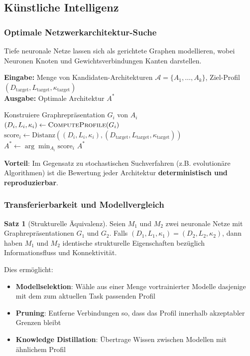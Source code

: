 ﻿\documentclass[a4paper,12pt]{article}
\theoremstyle{definition}
\newtheorem{satz}{Satz}
\begin{document}
	\subsection{Künstliche Intelligenz}

	\subsubsection{Optimale Netzwerkarchitektur-Suche}

	Tiefe neuronale Netze lassen sich als gerichtete Graphen modellieren, wobei Neuronen Knoten und Gewichtsverbindungen Kanten darstellen.
	
	\begin{algorithm}[H]
		\caption{Profilbasierte Neural Architecture Search}
		\label{alg:nas}
		\textbf{Eingabe:} Menge von Kandidaten-Architekturen $\mathcal{A} = \{A_1, \ldots, A_k\}$, Ziel-Profil $(D_{\text{target}}, L_{\text{target}}, \kappa_{\text{target}})$ \\
		\textbf{Ausgabe:} Optimale Architektur $A^*$
		\begin{algorithmic}[1]
			\State Konstruiere Graphrepräsentation $G_i$ von $A_i$
			\State $(D_i, L_i, \kappa_i) \gets \textsc{ComputeProfile}(G_i)$
			\State $\text{score}_i \gets \text{Distanz}((D_i, L_i, \kappa_i), (D_{\text{target}}, L_{\text{target}}, \kappa_{\text{target}}))$
			\EndFor
			\State $A^* \gets \arg\min_{A_i} \text{score}_i$
			\State \Return $A^*$
		\end{algorithmic}
	\end{algorithm}
	
	\textbf{Vorteil}: Im Gegensatz zu stochastischen Suchverfahren (z.B. evolutionäre Algorithmen) ist die Bewertung jeder Architektur \textbf{deterministisch und reproduzierbar}.
	
	\subsubsection{Transferierbarkeit und Modellvergleich}
	
	\begin{satz}[Strukturelle Äquivalenz]
		Seien $M_1$ und $M_2$ zwei neuronale Netze mit Graphrepräsentationen $G_1$ und $G_2$. Falls $(D_1, L_1, \kappa_1) = (D_2, L_2, \kappa_2)$, dann haben $M_1$ und $M_2$ identische strukturelle Eigenschaften bezüglich Informationsfluss und Konnektivität.
	\end{satz}
	
	Dies ermöglicht:
	\begin{itemize}
		\item[-] \textbf{Modellselektion}: Wähle aus einer Menge vortrainierter Modelle dasjenige mit dem zum aktuellen Task passenden Profil
		\item[-] \textbf{Pruning}: Entferne Verbindungen so, dass das Profil innerhalb akzeptabler Grenzen bleibt
		\item[-] \textbf{Knowledge Distillation}: Übertrage Wissen zwischen Modellen mit ähnlichem Profil
	\end{itemize}
	
\end{document}
